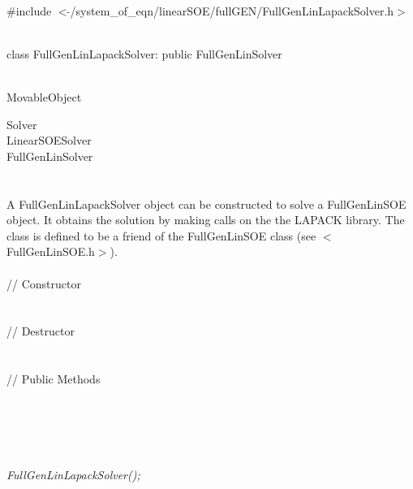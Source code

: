 
   \\
\#include $<\tilde{ }$/system\_of\_eqn/linearSOE/fullGEN/FullGenLinLapackSolver.h$>$  


  \\
class FullGenLinLapackSolver: public FullGenLinSolver  


 \\
 MovableObject 

\indent\indent  Solver \\
\indent\indent\indent LinearSOESolver \\
\indent\indent\indent\indent  FullGenLinSolver \\
\indent\indent\indent\indent{} \\

  \\
\indent A FullGenLinLapackSolver object can be constructed to solve
a FullGenLinSOE object. It obtains the solution by making calls on the
the LAPACK library. The class is defined to be a friend of the 
FullGenLinSOE class (see $<$FullGenLinSOE.h$>$). \\

  \\
\indent\indent // Constructor \\
\indent{}  \\ \\
\indent\indent // Destructor \\
\indent{}\\  \\
\indent\indent // Public Methods \\
\indent{} \\
\indent{} \\
\indent{} \\ 
\indent{} \\ 

  \\
{\em FullGenLinLapackSolver();}  

